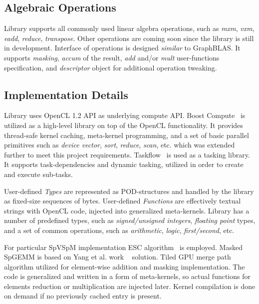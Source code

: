\subsection{Algebraic Operations}

Library supports all commonly used linear algebra operations, such as \textit{mxm}, \textit{vxm}, \textit{eadd}, \textit{reduce}, \textit{transpose}. 
Other operations are coming soon since the library is still in development.
Interface of operations is designed \textit{similar} to GraphBLAS. 
It supports \textit{masking}, \textit{accum} of the result, \textit{add} and/or \textit{mult} user-functions specification, and \textit{descriptor} object for additional operation tweaking.

\subsection{Implementation Details}

Library uses OpenCL 1.2 API as underlying compute API. 
Boost Compute~\cite{10.1145/2909437.2909454:boost:compute} is utilized as a high-level library on top of the OpenCL functionality. 
It provides thread-safe kernel caching, meta-kernel programming, and a set of basic parallel primitives such as \textit{device vector}, \textit{sort}, \textit{reduce}, \textit{scan}, etc. which was extended further to meet this project requirements.
Taskflow~\cite{Huang2022TaskflowAL} is used as a tasking library. It supports task-dependencies and dynamic tasking, utilized in order to create and execute sub-tasks. 

User-defined \textit{Types} are represented as POD-structures and handled by the library as fixed-size sequences of bytes.
User-defined \textit{Functions} are effectively textual strings with OpenCL code, injected into generalized meta-kernels.
Library has a number of predefined types, such as \textit{signed/unsigned integers}, \textit{floating point} types, and a set of common operations, such as \textit{arithmetic}, \textit{logic}, \textit{first/second}, etc.

For particular SpVSpM implementation ESC algorithm~\cite{10.1145/2699470:esc:algo} is employed. 
Masked SpGEMM is based on Yang et al. work ~\cite{yang2019graphblast} solution. 
Tiled GPU merge path~\cite{inproceedings:gpu_merge_path} algorithm utilized for element-wise addition and masking implementation.
The code is generalized and written in a form of meta-kernels, so actual functions for elements reduction or multiplication are injected later.
Kernel compilation is done on demand if no previously cached entry is present.